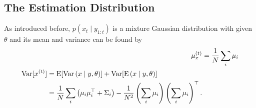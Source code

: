 \subsection*{The Estimation Distribution}

As introduced before, $p\left(x_t \mid y_{1:t}\right)$ is a mixture Gaussian distribution with given $\theta$ and its mean and variance can be found by 
\begin{align}
\mu_x^{\left(t\right)} &= \frac{1}{N} \sum_i \mu_i\\
\begin{split}\mathrm{Var}\lbrack x^{\left(t\right)}\rbrack
&= \mathrm{E}\lbrack \mathrm{Var}\left(x\mid y,\theta\right)\rbrack + \mathrm{Var}\lbrack\mathrm{E}\left(x\mid y,\theta\right)\rbrack \\
&= \frac{1}{N} \sum_i \left(\mu_i \mu_i^\top +\Sigma_i\right) -\frac{1}{N^2} \left(\sum_i  \mu_i\right)\left(\sum_i \mu_i\right)^\top. 
\end{split}
\end{align}

